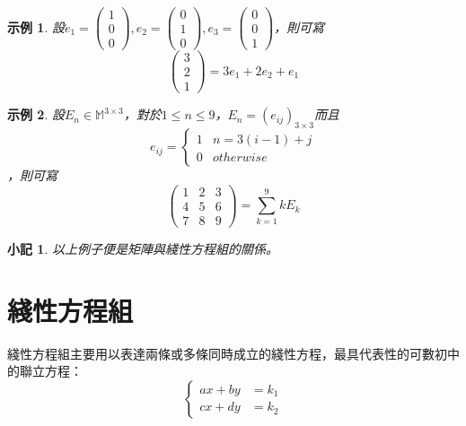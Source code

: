 \documentclass[12pt]{article}
\newtheorem*{remark}{小記}
\newtheorem*{example}{示例}
\begin{document}
    \begin{example}
        設$e_1=\begin{pmatrix}
            1\\0\\0
        \end{pmatrix},e_2=\begin{pmatrix}
            0\\1\\0
        \end{pmatrix},e_3=\begin{pmatrix}
            0\\0\\1
        \end{pmatrix}$，則可寫
            $$\begin{pmatrix}
                3\\2\\1
            \end{pmatrix}=3e_1+2e_2+e_1$$
    \end{example}

    \begin{example}
        設$E_n\in\mathbb{M}^{3\times 3}$，對於$1\leq n\leq 9$，$E_n=(e_{ij})_{3\times 3}$而且$$e_{ij}=\begin{cases}
            1 & n=3(i-1)+j\\ 0 & otherwise
        \end{cases}$$，則可寫
            $$\begin{pmatrix}
                1&2&3\\4&5&6\\7&8&9
            \end{pmatrix}=\sum_{k=1}^{9}kE_k$$
    \end{example}

    \begin{remark}
        以上例子便是矩陣與綫性方程組的關係。
    \end{remark}
    
    \newpage

    \section*{綫性方程組}

    綫性方程組主要用以表達兩條或多條同時成立的綫性方程，最具代表性的可數初中的聯立方程：$$\begin{cases}
        ax+by&=k_1\\cx+dy&=k_2
    \end{cases}$$
\end{document}
